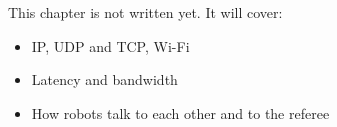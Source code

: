 \label{ch:hw2}
\begin{keyidea}
This chapter is not written yet. It will cover:
\begin{itemize}[nosep]
  \item IP, UDP and TCP, Wi-Fi
  \item Latency and bandwidth
  \item How robots talk to each other and to the referee
\end{itemize}
\end{keyidea}
